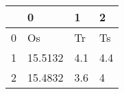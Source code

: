 \begin{tabular}{llll}
\toprule
{} &        0 &    1 &    2 \\
\midrule
0 &       Os &   Tr &   Ts \\
1 &  15.5132 &  4.1 &  4.4 \\
2 &  15.4832 &  3.6 &    4 \\
\bottomrule
\end{tabular}
